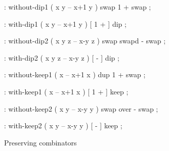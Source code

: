 \centering

  \begin{factorcode}
    : without-dip1 ( x y -- x+1 y )
        swap 1 + swap ;

    : with-dip1 ( x y -- x+1 y )
        [ 1 + ] dip ;
    
    : without-dip2 ( x y z -- x-y z )
        swap swapd - swap ;

    : with-dip2 ( x y z -- x-y z )
        [ - ] dip ;

    : without-keep1 ( x -- x+1 x )
        dup 1 + swap ;

    : with-keep1 ( x -- x+1 x )
        [ 1 + ] keep ;

    : without-keep2 ( x y -- x-y y )
        swap over - swap ;

    : with-keep2 ( x y -- x-y y )
        [ - ] keep ;
  \end{factorcode}

\caption{Preserving combinators}
